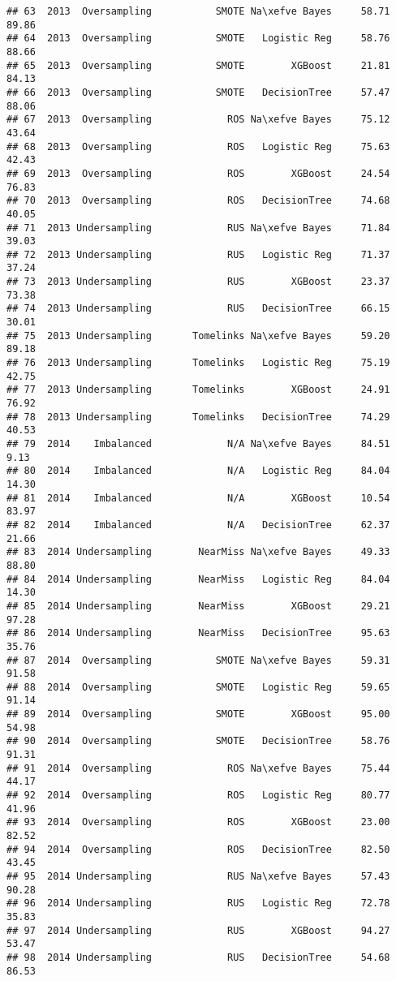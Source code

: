 \documentclass[
]{article}
\begin{document}
\begin{verbatim}
## 63  2013  Oversampling           SMOTE Na\xefve Bayes     58.71  89.86
## 64  2013  Oversampling           SMOTE   Logistic Reg     58.76  88.66
## 65  2013  Oversampling           SMOTE        XGBoost     21.81  84.13
## 66  2013  Oversampling           SMOTE   DecisionTree     57.47  88.06
## 67  2013  Oversampling             ROS Na\xefve Bayes     75.12  43.64
## 68  2013  Oversampling             ROS   Logistic Reg     75.63  42.43
## 69  2013  Oversampling             ROS        XGBoost     24.54  76.83
## 70  2013  Oversampling             ROS   DecisionTree     74.68  40.05
## 71  2013 Undersampling             RUS Na\xefve Bayes     71.84  39.03
## 72  2013 Undersampling             RUS   Logistic Reg     71.37  37.24
## 73  2013 Undersampling             RUS        XGBoost     23.37  73.38
## 74  2013 Undersampling             RUS   DecisionTree     66.15  30.01
## 75  2013 Undersampling       Tomelinks Na\xefve Bayes     59.20  89.18
## 76  2013 Undersampling       Tomelinks   Logistic Reg     75.19  42.75
## 77  2013 Undersampling       Tomelinks        XGBoost     24.91  76.92
## 78  2013 Undersampling       Tomelinks   DecisionTree     74.29  40.53
## 79  2014    Imbalanced             N/A Na\xefve Bayes     84.51   9.13
## 80  2014    Imbalanced             N/A   Logistic Reg     84.04  14.30
## 81  2014    Imbalanced             N/A        XGBoost     10.54  83.97
## 82  2014    Imbalanced             N/A   DecisionTree     62.37  21.66
## 83  2014 Undersampling        NearMiss Na\xefve Bayes     49.33  88.80
## 84  2014 Undersampling        NearMiss   Logistic Reg     84.04  14.30
## 85  2014 Undersampling        NearMiss        XGBoost     29.21  97.28
## 86  2014 Undersampling        NearMiss   DecisionTree     95.63  35.76
## 87  2014  Oversampling           SMOTE Na\xefve Bayes     59.31  91.58
## 88  2014  Oversampling           SMOTE   Logistic Reg     59.65  91.14
## 89  2014  Oversampling           SMOTE        XGBoost     95.00  54.98
## 90  2014  Oversampling           SMOTE   DecisionTree     58.76  91.31
## 91  2014  Oversampling             ROS Na\xefve Bayes     75.44  44.17
## 92  2014  Oversampling             ROS   Logistic Reg     80.77  41.96
## 93  2014  Oversampling             ROS        XGBoost     23.00  82.52
## 94  2014  Oversampling             ROS   DecisionTree     82.50  43.45
## 95  2014 Undersampling             RUS Na\xefve Bayes     57.43  90.28
## 96  2014 Undersampling             RUS   Logistic Reg     72.78  35.83
## 97  2014 Undersampling             RUS        XGBoost     94.27  53.47
## 98  2014 Undersampling             RUS   DecisionTree     54.68  86.53

\end{verbatim}
\end{document}
